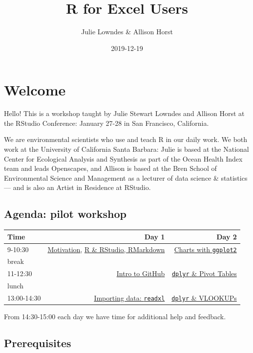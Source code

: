 \documentclass[]{book}
\title{R for Excel Users}
\author{Julie Lowndes \& Allison Horst}
\date{2019-12-19}
\begin{document}
\maketitle

{
\setcounter{tocdepth}{1}
\tableofcontents
}
\hypertarget{welcome}{%
\chapter{Welcome}\label{welcome}}

Hello! This is a workshop taught by Julie Stewart Lowndes and Allison Horst at the RStudio Conference: January 27-28 in San Francisco, California.

We are environmental scientists who use and teach R in our daily work. We both work at the University of California Santa Barbara: Julie is based at the National Center for Ecological Analysis and Synthesis as part of the Ocean Health Index team and leads Openscapes, and Allison is based at the Bren School of Environmental Science and Management as a lecturer of data science \& statistics --- and is also an Artist in Residence at RStudio.

\hypertarget{agenda-pilot-workshop}{%
\section{Agenda: pilot workshop}\label{agenda-pilot-workshop}}

\begin{longtable}[]{@{}lrr@{}}
\toprule
Time & Day 1 & Day 2\tabularnewline
\midrule
\endhead
9-10:30 & \protect\hyperlink{overview}{Motivation}, \protect\hyperlink{rstudio}{R \& RStudio, RMarkdown} & \protect\hyperlink{ggplot2}{Charts with \texttt{ggplot2}}\tabularnewline
break & &\tabularnewline
11-12:30 & \protect\hyperlink{github}{Intro to GitHub} & \protect\hyperlink{dplyr-pivot-tables}{\texttt{dplyr} \& Pivot Tables}\tabularnewline
lunch & &\tabularnewline
13:00-14:30 & \protect\hyperlink{readxl}{Importing data: \texttt{readxl}} & \protect\hyperlink{dplyr-vlookups}{\texttt{dplyr} \& VLOOKUPs}\tabularnewline
\bottomrule
\end{longtable}

From 14:30-15:00 each day we have time for additional help and feedback.

\hypertarget{prerequisites}{%
\section{Prerequisites}\label{prerequisites}}
\end{document}
